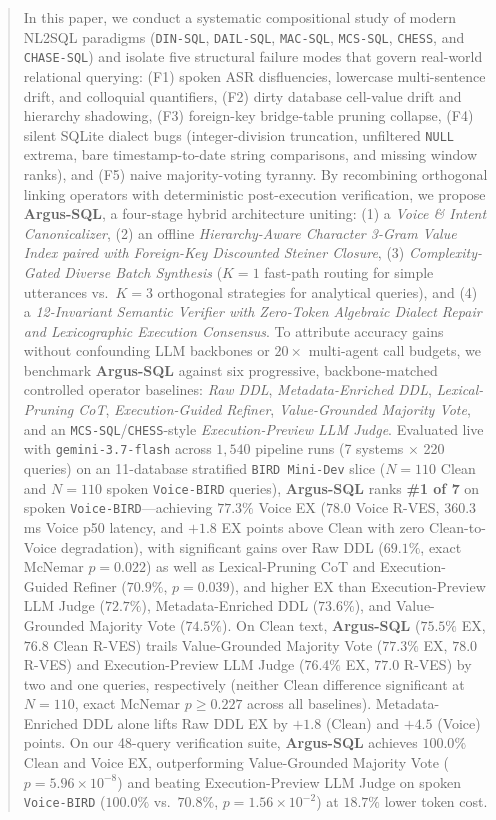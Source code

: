 \documentclass[10pt,twocolumn]{article}
\begin{document}
\begin{abstract}
In this paper, we conduct a systematic compositional study of modern NL2SQL paradigms (\texttt{DIN-SQL}, \texttt{DAIL-SQL}, \texttt{MAC-SQL}, \texttt{MCS-SQL}, \texttt{CHESS}, and \texttt{CHASE-SQL}) and isolate five structural failure modes that govern real-world relational querying: (F1) spoken ASR disfluencies, lowercase multi-sentence drift, and colloquial quantifiers, (F2) dirty database cell-value drift and hierarchy shadowing, (F3) foreign-key bridge-table pruning collapse, (F4) silent SQLite dialect bugs (integer-division truncation, unfiltered \texttt{NULL} extrema, bare timestamp-to-date string comparisons, and missing window ranks), and (F5) naive majority-voting tyranny. By recombining orthogonal linking operators with deterministic post-execution verification, we propose \textbf{Argus-SQL}, a four-stage hybrid architecture uniting: (1) a \emph{Voice \& Intent Canonicalizer}, (2) an offline \emph{Hierarchy-Aware Character 3-Gram Value Index paired with Foreign-Key Discounted Steiner Closure}, (3) \emph{Complexity-Gated Diverse Batch Synthesis} ($K=1$ fast-path routing for simple utterances vs.\ $K=3$ orthogonal strategies for analytical queries), and (4) a \emph{12-Invariant Semantic Verifier with Zero-Token Algebraic Dialect Repair and Lexicographic Execution Consensus}. To attribute accuracy gains without confounding LLM backbones or $20\times$ multi-agent call budgets, we benchmark \textbf{Argus-SQL} against six progressive, backbone-matched controlled operator baselines: \emph{Raw DDL}, \emph{Metadata-Enriched DDL}, \emph{Lexical-Pruning CoT}, \emph{Execution-Guided Refiner}, \emph{Value-Grounded Majority Vote}, and an \texttt{MCS-SQL}/\allowbreak\texttt{CHESS}-style \emph{Execution-Preview LLM Judge}. Evaluated live with \texttt{gemini-3.7-flash} across $1{,}540$ pipeline runs (7 systems $\times$ 220 queries) on an 11-database stratified \texttt{BIRD Mini-Dev} slice ($N=110$ Clean and $N=110$ spoken \texttt{Voice-BIRD} queries), \textbf{Argus-SQL} ranks \textbf{\#1 of 7} on spoken \texttt{Voice-BIRD}—achieving $77.3\%$ Voice EX ($78.0$ Voice R-VES, $360.3$\,ms Voice p50 latency, and $+1.8$ EX points above Clean with zero Clean-to-Voice degradation), with significant gains over Raw DDL ($69.1\%$, exact McNemar $p = 0.022$) as well as Lexical-Pruning CoT and Execution-Guided Refiner ($70.9\%$, $p = 0.039$), and higher EX than Execution-Preview LLM Judge ($72.7\%$), Metadata-Enriched DDL ($73.6\%$), and Value-Grounded Majority Vote ($74.5\%$). On Clean text, \textbf{Argus-SQL} ($75.5\%$ EX, $76.8$ Clean R-VES) trails Value-Grounded Majority Vote ($77.3\%$ EX, $78.0$ R-VES) and Execution-Preview LLM Judge ($76.4\%$ EX, $77.0$ R-VES) by two and one queries, respectively (neither Clean difference significant at $N=110$, exact McNemar $p \geq 0.227$ across all baselines). Metadata-Enriched DDL alone lifts Raw DDL EX by $+1.8$ (Clean) and $+4.5$ (Voice) points. On our 48-query verification suite, \textbf{Argus-SQL} achieves $100.0\%$ Clean and Voice EX, outperforming Value-Grounded Majority Vote ($p = 5.96 \times 10^{-8}$) and beating Execution-Preview LLM Judge on spoken \texttt{Voice-BIRD} ($100.0\%$ vs.\ $70.8\%$, $p = 1.56 \times 10^{-2}$) at $18.7\%$ lower token cost.
\end{abstract}
\end{document}
